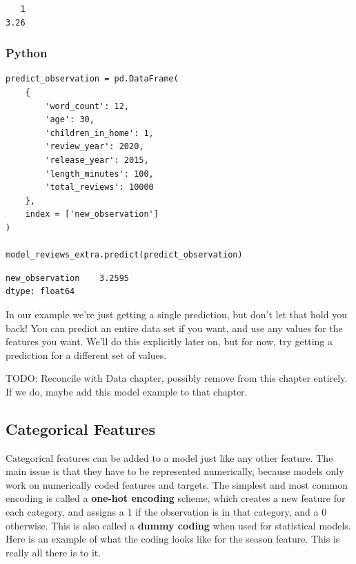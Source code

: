 \documentclass[
  letterpaper,
]{krantz}
\begin{document}
\begin{verbatim}
   1 
3.26 
\end{verbatim}

\subsubsection{Python}

\begin{verbatim}
predict_observation = pd.DataFrame(
    {
        'word_count': 12,
        'age': 30,
        'children_in_home': 1,
        'review_year': 2020,
        'release_year': 2015,
        'length_minutes': 100,
        'total_reviews': 10000
    },
    index = ['new_observation']
)

model_reviews_extra.predict(predict_observation)
\end{verbatim}

\begin{verbatim}
new_observation    3.2595
dtype: float64
\end{verbatim}

In our example we're just getting a single prediction, but don't let
that hold you back! You can predict an entire data set if you want, and
use any values for the features you want. We'll do this explicitly later
on, but for now, try getting a prediction for a different set of values.

TODO: Reconcile with Data chapter, possibly remove from this chapter
entirely. If we do, maybe add this model example to that chapter.

\subsection{Categorical Features}\label{sec-lm-categorical-features}

Categorical features can be added to a model just like any other
feature. The main issue is that they have to be represented numerically,
because models only work on numerically coded features and targets. The
simplest and most common encoding is called a \textbf{one-hot encoding}
scheme, which creates a new feature for each category, and assigns a 1
if the observation is in that category, and a 0 otherwise. This is also
called a \textbf{dummy coding} when used for statistical models. Here is
an example of what the coding looks like for the season feature. This is
really all there is to it.
\end{document}
